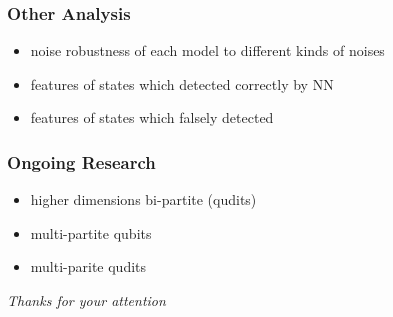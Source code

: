 \documentclass[11pt]{beamer}
\begin{document}
\begin{frame}
\frametitle{Other Analysis}

\begin{itemize}
 \item noise robustness of each model to different kinds of noises
 \item features of states which detected correctly by NN 
 \item features of states which falsely detected
\end{itemize}

\end{frame}


\begin{frame}
\frametitle{Ongoing Research}

\begin{itemize}
 \item higher dimensions bi-partite (qudits)
 \item multi-partite qubits
 \item multi-parite qudits
\end{itemize}

\end{frame}

\begin{frame}
  \centering \huge
  \emph{Thanks for your attention}
\end{frame}

\end{document}
